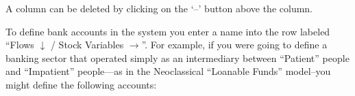 \begin{center}
\par\end{center}

A column can be deleted by clicking on the `--' button above the
column.

To define bank accounts in the system you enter a name into the row
labeled ``Flows $\downarrow$ / Stock Variables $\rightarrow$''.
For example, if you were going to define a banking sector that operated
simply as an intermediary between ``Patient'' people and ``Impatient''
people---as in the Neoclassical ``Loanable Funds'' model--you
might define the following accounts:

\begin{center}
\par\end{center}

